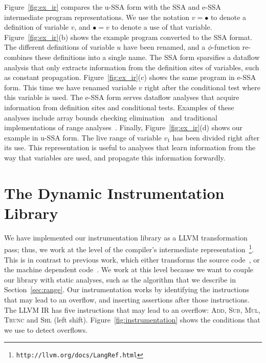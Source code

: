 \documentclass[preprint]{sigplanconf}[10pt]
\begin{document}
Figure~\ref{fig:ex_ir} compares the u-SSA form with the SSA and e-SSA
intermediate program representations.
We use the notation $v = \bullet$ to denote a definition of variable $v$, and
$\bullet = v$ to denote a use of that variable.
Figure~\ref{fig:ex_ir}(b) shows the example program converted to the SSA format.
The different definitions of variable $u$ have been renamed, and a
$\phi$-function re-combines these definitions into a single name.
The SSA form sparsifies a dataflow analysis that only extracts information from
the definition sites of variables, such as constant propagation.
Figure~\ref{fig:ex_ir}(c) shows the same program in e-SSA form.
This time we have renamed variable $v$ right after the conditional test where
this variable is used.
The e-SSA form serves dataflow analyses that acquire information from definition
sites and conditional tests.
Examples of these analyses include array bounds checking
elimination~\cite{Bodik00} and traditional implementations of range
analyses~\cite{Gough94,Patterson95}.
Finally, Figure~\ref{fig:ex_ir}(d) shows our example in u-SSA form.
The live range of variable $v_1$ has been divided right after its use.
This representation is useful to analyses that learn information from the way
that variables are used, and propagate this information forwardly.

\section{The Dynamic Instrumentation Library}
\label{sec:dyn}

We have implemented our instrumentation library as a LLVM transformation pass;
thus, we work at the level of the compiler's intermediate
representation~\footnote{\texttt{http://llvm.org/docs/LangRef.html}}.
This is in contrast to previous work, which either transforms the
source code~\cite{Dietz12}, or the machine dependent code~\cite{Brumley07}.
We work at this level because we want to couple our library with static
analyses, such as the algorithm that we describe in Section~\ref{sec:range}.
Our instrumentation works by identifying the instructions that may 
lead to an overflow, and inserting assertions after those instructions. 
The LLVM IR has five instructions that may lead to an overflow:
\textsc{Add}, \textsc{Sub}, \textsc{Mul},  \textsc{Trunc} and \textsc{Shl}
(left shift).
Figure~\ref{fig:instrumentation} shows the conditions that we use to
detect overflows.
\end{document}
